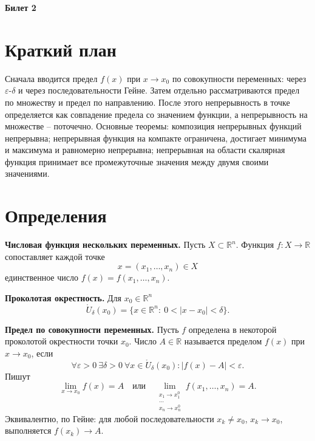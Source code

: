 \documentclass[12pt,a4paper]{article}
\newcommand{\R}{\mathbb{R}}
\newcommand{\eps}{\varepsilon}
\newcommand{\PBall}[2]{\mathring U_{#1}(#2)}
\begin{document}
\begin{center}
{\Large\bfseries Билет 2}
\end{center}

\noindent{}

\section*{Краткий план}

Сначала вводится предел \(f(x)\) при \(x\to x_0\) по совокупности переменных:
через \(\eps\)-\(\delta\) и через последовательности Гейне. Затем отдельно
рассматриваются предел по множеству и предел по направлению. После этого
непрерывность в точке определяется как совпадение предела со значением функции,
а непрерывность на множестве -- поточечно. Основные теоремы: композиция
непрерывных функций непрерывна; непрерывная функция на компакте ограничена,
достигает минимума и максимума и равномерно непрерывна; непрерывная на области
скалярная функция принимает все промежуточные значения между двумя своими
значениями.

\section*{Определения}

\textbf{Числовая функция нескольких переменных.}
Пусть \(X\subset\R^n\). Функция \(f:X\to\R\) сопоставляет каждой точке
\[
  x=(x_1,\dots,x_n)\in X
\]
единственное число \(f(x)=f(x_1,\dots,x_n)\).

\textbf{Проколотая окрестность.}
Для \(x_0\in\R^n\)
\[
  \PBall{\delta}{x_0}
  =\{x\in\R^n:\ 0<|x-x_0|<\delta\}.
\]

\textbf{Предел по совокупности переменных.}
Пусть \(f\) определена в некоторой проколотой окрестности точки \(x_0\).
Число \(A\in\R\) называется пределом \(f(x)\) при \(x\to x_0\), если
\[
  \forall\eps>0\ \exists\delta>0\ \forall x\in\PBall{\delta}{x_0}:
  |f(x)-A|<\eps .
\]
Пишут
\[
  \lim_{x\to x_0}f(x)=A
  \quad\text{или}\quad
  \lim_{\substack{x_1\to x_1^0\\ \dots\\ x_n\to x_n^0}}
  f(x_1,\dots,x_n)=A.
\]
Эквивалентно, по Гейне: для любой последовательности \(x_k\ne x_0\),
\(x_k\to x_0\), выполняется \(f(x_k)\to A\).
\end{document}
